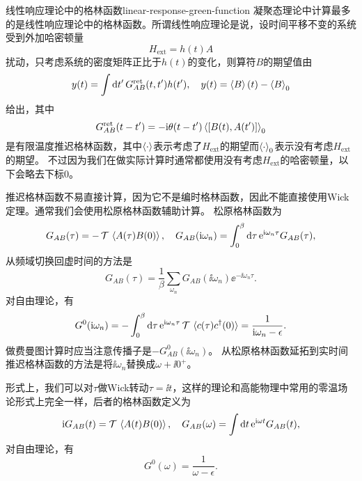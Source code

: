 \begin{back}{线性响应理论中的格林函数}{linear-response-green-function}
    凝聚态理论中计算最多的是线性响应理论中的格林函数。所谓线性响应理论是说，设时间平移不变的系统受到外加哈密顿量
    \begin{equation}
        H_\text{ext} = h(t) A
    \end{equation}
    扰动，只考虑系统的密度矩阵正比于$h(t)$的变化，则算符$B$的期望值由
    \begin{equation}
        y(t) = \int \dd{t'} G^\text{ret}_{AB}(t, t') h(t'), \quad y(t) = \expval{B}(t) - \expval{B}_0
    \end{equation}
    给出，其中
    \begin{equation}
        G^\text{ret}_{AB}(t-t') = - \mathrm{i} \theta(t-t') \expval{[B(t), A(t')]}_0
    \end{equation}
    是有限温度推迟格林函数，其中$\expval{\cdot}$表示考虑了$H_\text{ext}$的期望而$\expval{\cdot}_0$表示没有考虑$H_\text{ext}$的期望。
    不过因为我们在做实际计算时通常都使用没有考虑$H_\text{ext}$的哈密顿量，以下会略去下标$0$。

    推迟格林函数不易直接计算，因为它不是编时格林函数，因此不能直接使用Wick定理。通常我们会使用松原格林函数辅助计算。
    松原格林函数为
    \begin{equation}
        G_{AB}(\tau) = - \operatorname{\mathcal{T}} \expval*{A(\tau) B(0)}, \quad G_{AB}(\mathrm{i} \omega_n) = \int_0^\beta \dd{\tau} \mathrm{e}^{\mathrm{i} \omega_n \tau} G_{AB}(\tau),
    \end{equation}
    从频域切换回虚时间的方法是
    \begin{equation}
        G_{AB}(\tau) = \frac{1}{\beta} \sum_{\omega_n} G_{AB}(\ii \omega_n) \ee^{- \ii \omega_n \tau}.
    \end{equation}
    对自由理论，有
    \begin{equation}
        G^{0}(\mathrm{i} \omega_n) = - \int_0^\beta \dd{\tau} \mathrm{e}^{\mathrm{i} \omega_n \tau} \operatorname{\mathcal{T}} \expval*{c(\tau) c^\dagger(0)} = \frac{1}{\mathrm{i} \omega_n - \epsilon}.
    \end{equation}
    做费曼图计算时应当注意传播子是$-G^{0}_{AB}(\ii \omega_n)$。
    从松原格林函数延拓到实时间推迟格林函数的方法是将$\ii \omega_n$替换成$\omega + \ii 0^+$。

    形式上，我们可以对$\tau$做Wick转动$\tau = \ii t$，这样的理论和高能物理中常用的零温场论形式上完全一样，后者的格林函数定义为
    \begin{equation}
        \mathrm{i} G_{AB}(t) = \operatorname{\mathcal{T}} \expval*{A(t) B(0)}, \quad G_{AB}(\omega) = \int \dd{t} \mathrm{e}^{\mathrm{i} \omega t} G_{AB}(t),
    \end{equation}
    对自由理论，有
    \begin{equation}
        G^0(\omega) = \frac{1}{\omega - \epsilon}.
    \end{equation}


\end{back}
